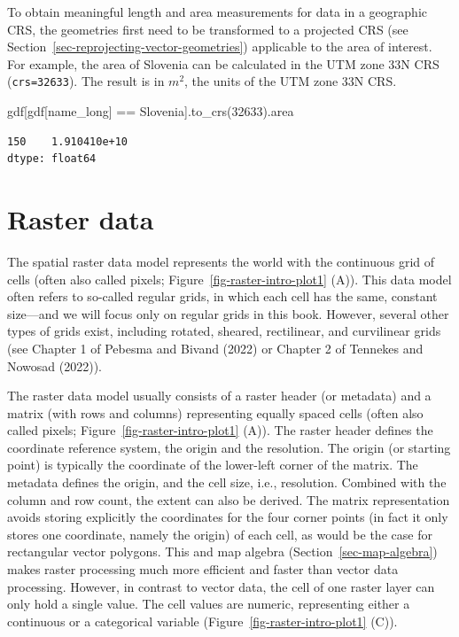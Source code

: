 \documentclass[
  letterpaper,
]{krantz}
\newenvironment{Shaded}{\begin{snugshade}}{\end{snugshade}}
\newcommand{\DecValTok}[1]{\textcolor[rgb]{0.68,0.00,0.00}{#1}}
\newcommand{\NormalTok}[1]{\textcolor[rgb]{0.00,0.23,0.31}{#1}}
\newcommand{\OperatorTok}[1]{\textcolor[rgb]{0.37,0.37,0.37}{#1}}
\newcommand{\StringTok}[1]{\textcolor[rgb]{0.13,0.47,0.30}{#1}}
\begin{document}
To obtain meaningful length and area measurements for data in a
geographic CRS, the geometries first need to be transformed to a
projected CRS (see Section~\ref{sec-reprojecting-vector-geometries})
applicable to the area of interest. For example, the area of Slovenia
can be calculated in the UTM zone 33N CRS (\texttt{crs=32633}). The
result is in \(m^2\), the units of the UTM zone 33N CRS.

\begin{Shaded}
\begin{Highlighting}[]
\NormalTok{gdf[gdf[}\StringTok{\textquotesingle{}name\_long\textquotesingle{}}\NormalTok{] }\OperatorTok{==} \StringTok{\textquotesingle{}Slovenia\textquotesingle{}}\NormalTok{].to\_crs(}\DecValTok{32633}\NormalTok{).area}
\end{Highlighting}
\end{Shaded}

\begin{verbatim}
150    1.910410e+10
dtype: float64
\end{verbatim}

\section{Raster data}\label{sec-raster-data}

The spatial raster data model represents the world with the continuous
grid of cells (often also called pixels;
Figure~\ref{fig-raster-intro-plot1} (A)). This data model often refers
to so-called regular grids, in which each cell has the same, constant
size---and we will focus only on regular grids in this book. However,
several other types of grids exist, including rotated, sheared,
rectilinear, and curvilinear grids (see Chapter 1 of Pebesma and Bivand
(2022) or Chapter 2 of Tennekes and Nowosad (2022)).

The raster data model usually consists of a raster header (or metadata)
and a matrix (with rows and columns) representing equally spaced cells
(often also called pixels; Figure~\ref{fig-raster-intro-plot1} (A)). The
raster header defines the coordinate reference system, the origin and
the resolution. The origin (or starting point) is typically the
coordinate of the lower-left corner of the matrix. The metadata defines
the origin, and the cell size, i.e., resolution. Combined with the
column and row count, the extent can also be derived. The matrix
representation avoids storing explicitly the coordinates for the four
corner points (in fact it only stores one coordinate, namely the origin)
of each cell, as would be the case for rectangular vector polygons. This
and map algebra (Section~\ref{sec-map-algebra}) makes raster processing
much more efficient and faster than vector data processing. However, in
contrast to vector data, the cell of one raster layer can only hold a
single value. The cell values are numeric, representing either a
continuous or a categorical variable
(Figure~\ref{fig-raster-intro-plot1} (C)).
\end{document}

